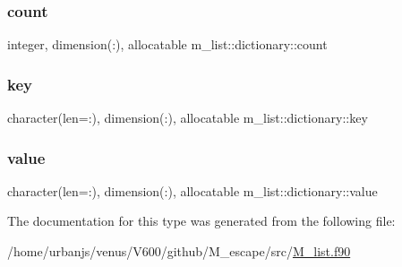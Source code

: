 \subsubsection{\texorpdfstring{count}{count}}
{\footnotesize\ttfamily integer, dimension(\+:), allocatable m\+\_\+list\+::dictionary\+::count\hspace{0.3cm}{\ttfamily [private]}}

\mbox{\label{structm__list_1_1dictionary_af8502b1d3e850ca83eca50abbd79b6ae}} 
\subsubsection{\texorpdfstring{key}{key}}
{\footnotesize\ttfamily character(len=\+:), dimension(\+:), allocatable m\+\_\+list\+::dictionary\+::key\hspace{0.3cm}{\ttfamily [private]}}

\mbox{\label{structm__list_1_1dictionary_adaa76f04dc0ba6808c76805f7b4864b1}} 
\subsubsection{\texorpdfstring{value}{value}}
{\footnotesize\ttfamily character(len=\+:), dimension(\+:), allocatable m\+\_\+list\+::dictionary\+::value\hspace{0.3cm}{\ttfamily [private]}}



The documentation for this type was generated from the following file\+:\begin{DoxyCompactItemize}
\item 
/home/urbanjs/venus/\+V600/github/\+M\+\_\+escape/src/\mbox{\hyperlink{M__list_8f90}{M\+\_\+list.\+f90}}\end{DoxyCompactItemize}
